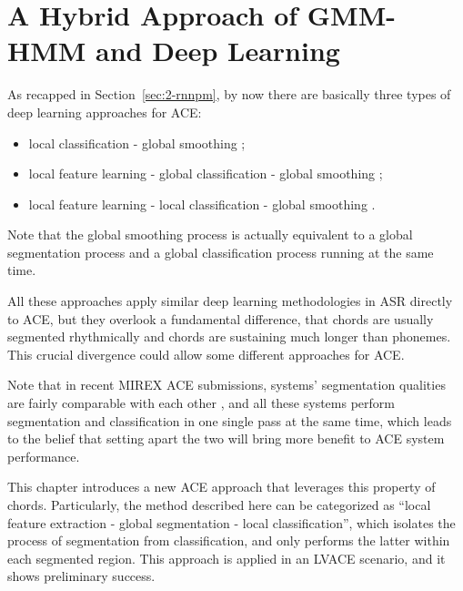 
\chapter{A Hybrid Approach of GMM-HMM and Deep Learning}\label{cp:ghmm} %


As recapped in Section~\ref{sec:2-rnnpm}, by now there are basically three types of deep learning approaches for ACE:
\begin{itemize}
\item local classification - global smoothing \cite{humphrey2012rethinking};
\item local feature learning - global classification - global smoothing \cite{boulanger2013audio,sigtia2015audio};
\item local feature learning - local classification - global smoothing \cite{zhou2015chord}.
\end{itemize}
Note that the global smoothing process is actually equivalent to a global segmentation process and a global classification process running at the same time.

All these approaches apply similar deep learning methodologies in ASR \cite{deng2014deep,bourlard2012connectionist} directly to ACE, but they overlook a fundamental difference, that chords are usually segmented rhythmically and chords are sustaining much longer than phonemes. This crucial divergence could allow some different approaches for ACE.

Note that in recent MIREX ACE submissions, systems' segmentation qualities are fairly comparable with each other \cite{burgoyne2014comparative}, and all these systems perform segmentation and classification in one single pass at the same time, which leads to the belief that setting apart the two will bring more benefit to ACE system performance.

This chapter introduces a new ACE approach that leverages this property of chords. Particularly, the method described here can be categorized as ``local feature extraction - global segmentation - local classification'', which isolates the process of segmentation from classification, and only performs the latter within each segmented region. This approach is applied in an LVACE scenario, and it shows preliminary success.

